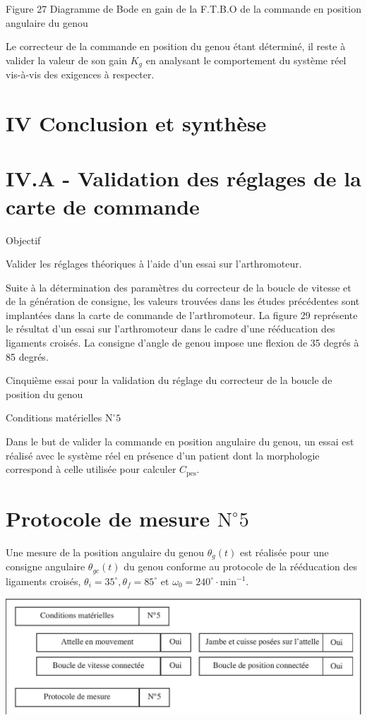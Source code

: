 \documentclass[10pt]{article}
\begin{document}
Figure 27 Diagramme de Bode en gain de la F.T.B.O de la commande en position angulaire du genou

Le correcteur de la commande en position du genou étant déterminé, il reste à valider la valeur de son gain $K_{g}$ en analysant le comportement du système réel vis-à-vis des exigences à respecter.

\section*{IV Conclusion et synthèse}
\section*{IV.A - Validation des réglages de la carte de commande}
Objectif

Valider les réglages théoriques à l'aide d'un essai sur l'arthromoteur.

Suite à la détermination des paramètres du correcteur de la boucle de vitesse et de la génération de consigne, les valeurs trouvées dans les études précédentes sont implantées dans la carte de commande de l'arthromoteur. La figure 29 représente le résultat d'un essai sur l'arthromoteur dans le cadre d'une rééducation des ligaments croisés. La consigne d'angle de genou impose une flexion de 35 degrés à 85 degrés.

Cinquième essai pour la validation du réglage du correcteur de la boucle de position du genou

Conditions matérielles $\mathrm{N}^{\circ} 5$

Dans le but de valider la commande en position angulaire du genou, un essai est réalisé avec le système réel en présence d'un patient dont la morphologie correspond à celle utilisée pour calculer $C_{\mathrm{pes}}$.

\section*{Protocole de mesure $\mathrm{N}^{\circ} 5$}
Une mesure de la position angulaire du genou $\theta_{g}(t)$ est réalisée pour une consigne angulaire $\theta_{g c}(t)$ du genou conforme au protocole de la rééducation des ligaments croisés, $\theta_{i}=35^{\circ}, \theta_{f}=85^{\circ}$ et $\omega_{0}=240^{\circ} \cdot \mathrm{min}^{-1}$.

\begin{center}
\includegraphics[max width=\textwidth]{2024_07_14_a83aebba33898893d39fg-16}
\end{center}
\end{document}
